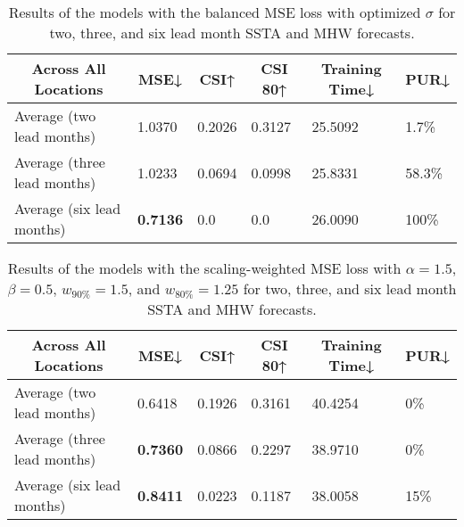 \documentclass[11pt, a4paper]{article}
\begin{document}
\begin{table}[H]
\centering
\scriptsize
\caption{Results of the models with the balanced MSE loss with optimized $\sigma$ for two, three, and six lead month SSTA and MHW forecasts.}\label{tb:bmseall}
\begin{tabular}{llllll}
\multicolumn{1}{c}{\textbf{Across All Locations}} & \multicolumn{1}{c}{\textbf{MSE↓}} & \multicolumn{1}{c}{\textbf{CSI↑}} & \multicolumn{1}{c}{\textbf{CSI 80↑}} & \multicolumn{1}{c}{\textbf{Training Time↓}} & \multicolumn{1}{c}{\textbf{PUR↓}} \\ \hline
Average (two lead months)             & 1.0370                            & 0.2026                            & 0.3127                               & 25.5092                                     & 1.7\%                             \\
Average (three lead months)           & 1.0233                            & 0.0694                            & 0.0998                               & 25.8331                                     & 58.3\%                            \\
Average (six lead months)             & \textbf{0.7136}                   & 0.0                               & 0.0                                  & 26.0090                                     & 100\%
\end{tabular}
\end{table}

\begin{table}[H]
\centering
\scriptsize
\caption{Results of the models with the scaling-weighted MSE loss with $\alpha=1.5$, $\beta=0.5$, $w_{90\%}=1.5$, and $w_{80\%}=1.25$ for two, three, and six lead month SSTA and MHW forecasts.}\label{tb:swmse1all}
\begin{tabular}{llllll}
\multicolumn{1}{c}{\textbf{Across All Locations}} & \multicolumn{1}{c}{\textbf{MSE↓}} & \multicolumn{1}{c}{\textbf{CSI↑}} & \multicolumn{1}{c}{\textbf{CSI 80↑}} & \multicolumn{1}{c}{\textbf{Training Time↓}} & \multicolumn{1}{c}{\textbf{PUR↓}} \\ \hline
Average (two lead months)             & 0.6418                            & 0.1926                            & 0.3161                               & 40.4254                                     & 0\%                               \\
Average (three lead months)           & \textbf{0.7360}                   & 0.0866                            & 0.2297                               & 38.9710                                     & 0\%                               \\
Average (six lead months)             & \textbf{0.8411}                   & 0.0223                            & 0.1187                               & 38.0058                                     & 15\%
\end{tabular}
\end{table}
\end{document}
